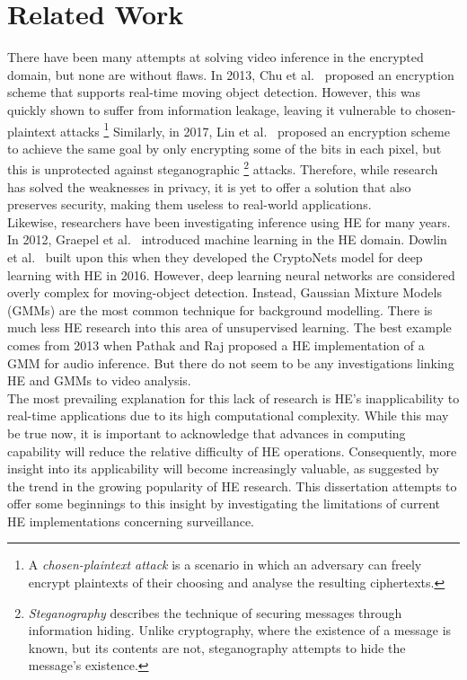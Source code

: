 \setlength{\leftskip}{0cm}


\section{Related Work}
\label{sec:relatedWork}
\setlength{\leftskip}{0.25cm}
\indent \indent
There have been many attempts at solving video inference in the encrypted domain, but none are without flaws. In 2013, Chu et al.\ \cite{Chu} proposed an encryption scheme that supports real-time moving object detection. However, this was quickly shown to suffer from information leakage, leaving it vulnerable to chosen-plaintext attacks \footnote{A \textit{chosen-plaintext attack} is a scenario in which an adversary can freely encrypt plaintexts of their choosing and analyse the resulting ciphertexts.} Similarly, in 2017, Lin et al.\ \cite{Lin} proposed an encryption scheme to achieve the same goal by only encrypting some of the bits in each pixel, but this is unprotected against steganographic \footnote{\textit{Steganography} describes the technique of securing messages through information hiding. Unlike cryptography, where the existence of a message is known, but its contents are not, steganography attempts to hide the message's existence.} attacks. Therefore, while research has solved the weaknesses in privacy, it is yet to offer a solution that also preserves security, making them useless to real-world applications.
\smallskip \\ \indent
Likewise, researchers have been investigating inference using HE for many years. In 2012, Graepel et al.\ \cite {Graepel} introduced machine learning in the HE domain. Dowlin et al.\ \cite{Dowlin} built upon this when they developed the CryptoNets model for deep learning with HE in 2016. However, deep learning neural networks are considered overly complex for moving-object detection. Instead, Gaussian Mixture Models (GMMs) are the most common technique for background modelling. There is much less HE research into this area of unsupervised learning. The best example comes from 2013 when Pathak and Raj \cite{Pathak} proposed a HE implementation of a GMM for audio inference. But there do not seem to be any investigations linking HE and GMMs to video analysis.
\smallskip \\ \indent
The most prevailing explanation for this lack of research is HE's inapplicability to real-time applications due to its high computational complexity. While this may be true now, it is important to acknowledge that advances in computing capability will reduce the relative difficulty of HE operations. Consequently, more insight into its applicability will become increasingly valuable, as suggested by the trend in the growing popularity of HE research. This dissertation attempts to offer some beginnings to this insight by investigating the limitations of current HE implementations concerning surveillance.

